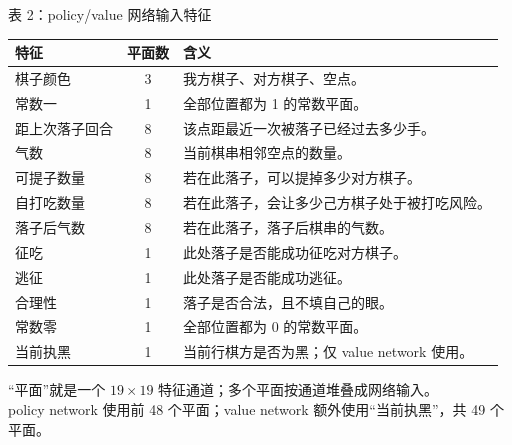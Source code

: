 \documentclass[UTF8,aspectratio=169,10pt]{ctexbeamer}
\begin{document}
\begin{frame}{表 2：policy/value 网络输入特征}
  \begin{center}
    \scriptsize
    \renewcommand{\arraystretch}{0.92}
    \begin{tabular}{p{}cp{}}
      \toprule
      特征 & 平面数 & 含义 \\
      \midrule
      棋子颜色 & 3 & 我方棋子、对方棋子、空点。 \\
      常数一 & 1 & 全部位置都为 1 的常数平面。 \\
      距上次落子回合 & 8 & 该点距最近一次被落子已经过去多少手。 \\
      气数 & 8 & 当前棋串相邻空点的数量。 \\
      可提子数量 & 8 & 若在此落子，可以提掉多少对方棋子。 \\
      自打吃数量 & 8 & 若在此落子，会让多少己方棋子处于被打吃风险。 \\
      落子后气数 & 8 & 若在此落子，落子后棋串的气数。 \\
      征吃 & 1 & 此处落子是否能成功征吃对方棋子。 \\
      逃征 & 1 & 此处落子是否能成功逃征。 \\
      合理性 & 1 & 落子是否合法，且不填自己的眼。 \\
      常数零 & 1 & 全部位置都为 0 的常数平面。 \\
      当前执黑 & 1 & 当前行棋方是否为黑；仅 value network 使用。 \\
      \bottomrule
    \end{tabular}
  \end{center}

  \vspace{0.06cm}
  \begin{center}
    \scriptsize
    “平面”就是一个 $19\times19$ 特征通道；多个平面按通道堆叠成网络输入。\\
    policy network 使用前 48 个平面；value network 额外使用“当前执黑”，共 49 个平面。
  \end{center}
\end{frame}
\end{document}
